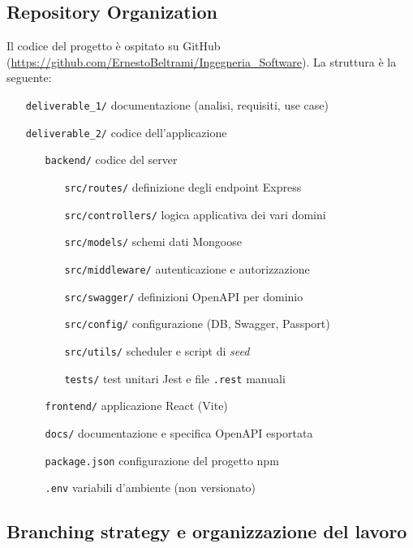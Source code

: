 \documentclass{article}
\newcommand{\code}[1]{\texttt{\small #1}}
\begin{document}
\subsection{Repository Organization}

Il codice del progetto è ospitato su GitHub
(\url{https://github.com/ErnestoBeltrami/Ingegneria_Software}). La struttura è la seguente:

\begin{itemize}[leftmargin=2cm]
	\item[\code{deliverable\_1/}] documentazione (analisi, requisiti, use case)
	\item[\code{deliverable\_2/}] codice dell'applicazione
	\begin{itemize}[leftmargin=1.5cm]
		\item[\code{backend/}] codice del server
		\begin{itemize}[leftmargin=1.5cm]
			\item[\code{src/routes/}] definizione degli endpoint Express
			\item[\code{src/controllers/}] logica applicativa dei vari domini
			\item[\code{src/models/}] schemi dati Mongoose
			\item[\code{src/middleware/}] autenticazione e autorizzazione
			\item[\code{src/swagger/}] definizioni OpenAPI per dominio
			\item[\code{src/config/}] configurazione (DB, Swagger, Passport)
			\item[\code{src/utils/}] scheduler e script di \textit{seed}
			\item[\code{tests/}] test unitari Jest e file \code{.rest} manuali
		\end{itemize}
		\item[\code{frontend/}] applicazione React (Vite)
		\item[\code{docs/}] documentazione e specifica OpenAPI esportata
		\item[\code{package.json}] configurazione del progetto npm
		\item[\code{.env}] variabili d'ambiente (non versionato)
	\end{itemize}
\end{itemize}

\subsection{Branching strategy e organizzazione del lavoro}
\end{document}
